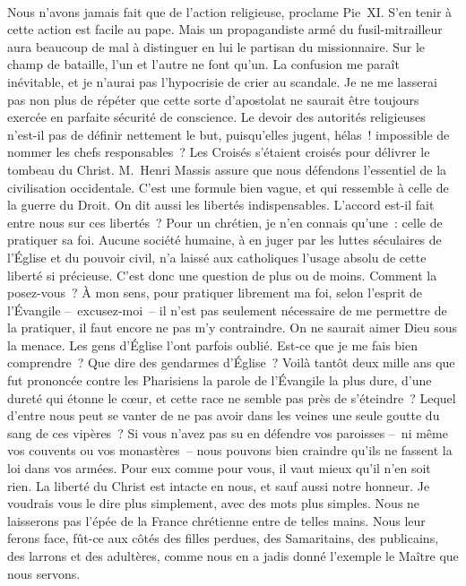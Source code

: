 \documentclass[french,twoside]{book} %
\begin{document}
\noindent  \par
Nous n’avons jamais fait que de l’action religieuse, proclame Pie \textsc{XI}. S’en tenir à cette action est facile au pape. Mais un propagandiste armé du fusil-mitrailleur aura beaucoup de mal à distinguer en lui le partisan du missionnaire. Sur le champ de bataille, l’un et l’autre ne font qu’un. La confusion me paraît inévitable, et je n’aurai pas l’hypocrisie de crier au scandale. Je ne me lasserai pas non plus de répéter que cette sorte d’apostolat ne saurait être toujours exercée en parfaite sécurité de conscience. Le devoir des autorités religieuses n’est-il pas de définir nettement le but, puisqu’elles jugent, hélas ! impossible de nommer les chefs responsables ? Les Croisés s’étaient croisés pour délivrer le tombeau du Christ. M. Henri Massis assure que nous défendons l’essentiel de la civilisation occidentale. C’est une formule bien vague, et qui ressemble à celle de la guerre du Droit. On dit aussi les libertés indispensables. L’accord est-il fait entre nous sur ces libertés ? Pour un chrétien, je n’en connais qu’une : celle de pratiquer sa foi. Aucune société humaine, à en juger par les luttes séculaires de l’Église et du pouvoir civil, n’a laissé aux catholiques l’usage absolu de cette liberté si précieuse. C’est donc une question de plus ou de moins. Comment la posez-vous ? À mon sens, pour pratiquer librement ma foi, selon l’esprit de l’Évangile – excusez-moi – il n’est pas seulement nécessaire de me permettre de la pratiquer, il faut encore ne pas m’y contraindre. On ne saurait aimer Dieu sous la menace. Les gens d’Église l’ont parfois oublié. Est-ce que je me fais bien comprendre ? Que dire des gendarmes d’Église ? Voilà tantôt deux mille ans que fut prononcée contre les Pharisiens la parole de l’Évangile la plus dure, d’une dureté qui étonne le cœur, et cette race ne semble pas près de s’éteindre ? Lequel d’entre nous peut se vanter de ne pas avoir dans les veines une seule goutte du sang de ces vipères ? Si vous n’avez pas su en défendre vos paroisses – ni même vos couvents ou vos monastères – nous pouvons bien craindre qu’ils ne fassent la loi dans vos armées. Pour eux comme pour vous, il vaut mieux qu’il n’en soit rien. La liberté du Christ est intacte en nous, et sauf aussi notre honneur. Je voudrais vous le dire plus simplement, avec des mots plus simples. Nous ne laisserons pas l’épée de la France chrétienne entre de telles mains. Nous leur ferons face, fût-ce aux côtés des filles perdues, des Samaritains, des publicains, des larrons et des adultères, comme nous en a jadis donné l’exemple le Maître que nous servons.\par
 \par
\end{document}
